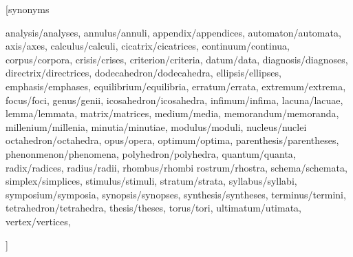 


[synonyms

analysis/analyses,
annulus/annuli,
appendix/appendices,
automaton/automata,
axis/axes,
calculus/calculi,
cicatrix/cicatrices,
continuum/continua,
corpus/corpora,
crisis/crises,
criterion/criteria,
datum/data,
diagnosis/diagnoses,
directrix/directrices,
dodecahedron/dodecahedra,
ellipsis/ellipses,
emphasis/emphases,
equilibrium/equilibria,
erratum/errata,
extremum/extrema,
focus/foci,
genus/genii,
icosahedron/icosahedra,
infimum/infima,
lacuna/lacuae,
lemma/lemmata,
matrix/matrices,
medium/media,
memorandum/memoranda,
millenium/millenia,
minutia/minutiae,
modulus/moduli,
nucleus/nuclei
octahedron/octahedra,
opus/opera,
optimum/optima,
parenthesis/parentheses,
phenonmenon/phenomena,
polyhedron/polyhedra,
quantum/quanta,
radix/radices,
radius/radii,
rhombus/rhombi
rostrum/rhostra,
schema/schemata,
simplex/simplices,
stimulus/stimuli,
stratum/strata,
syllabus/syllabi,
symposium/symposia,
synopsis/synopses,
synthesis/syntheses,
terminus/termini,
tetrahedron/tetrahedra,
thesis/theses,
torus/tori,
ultimatum/utimata,
vertex/vertices,





]
